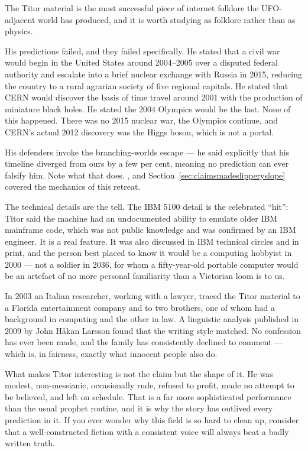The Titor material is the most successful piece of internet folklore the UFO-adjacent world
has produced, and it is worth studying as folklore rather than as physics.

His predictions failed, and they failed specifically. He stated that a civil war would begin
in the United States around 2004--2005 over a disputed federal authority and escalate into a
brief nuclear exchange with Russia in 2015, reducing the country to a rural agrarian society
of five regional capitals. He stated that CERN would discover the basis of time travel around
2001 with the production of miniature black holes. He stated the 2004 Olympics would be the
last. None of this happened. There was no 2015 nuclear war, the Olympics continue, and CERN's
actual 2012 discovery was the Higgs boson, which is not a portal.

His defenders invoke the branching-worlds escape --- he said explicitly that his timeline
diverged from ours by a few per cent, meaning no prediction can ever falsify him. Note what
that does. , and
Section~\ref{sec:claimsmadeslipperyslope} covered the mechanics of this retreat.

The technical details are the tell. The IBM 5100 detail is the celebrated ``hit'': Titor
said the machine had an undocumented ability to emulate older IBM mainframe code, which was
not public knowledge and was confirmed by an IBM engineer. It is a real feature. It was also
discussed in IBM technical circles and in print, and the person best placed to know it would
be a computing hobbyist in 2000 --- not a soldier in 2036, for whom a fifty-year-old
portable computer would be an artefact of no more personal familiarity than a Victorian
loom is to us.

\begin{funfact}
In 2003 an Italian researcher, working with a lawyer, traced the Titor material to a
Florida entertainment company and to two brothers, one of whom had a background in computing
and the other in law. A linguistic analysis published in 2009 by John H\aa{}kan Larsson found
that the writing style matched. No confession has ever been made, and the family has
consistently declined to comment --- which is, in fairness, exactly what innocent people also
do.
\end{funfact}

What makes Titor interesting is not the claim but the shape of it. He was modest,
non-messianic, occasionally rude, refused to profit, made no attempt to be believed, and
left on schedule. That is a far more sophisticated performance than the usual prophet
routine, and it is why the story has outlived every prediction in it. If you ever wonder why
this field is so hard to clean up, consider that a well-constructed fiction with a
consistent voice will always beat a badly written truth.

